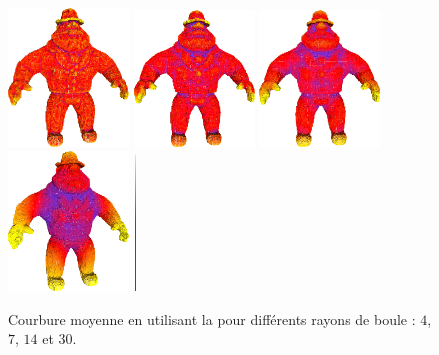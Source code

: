 \begin{figure}[ht]{
    \begin{center}
      \includegraphics[width=3.2cm]{images/Curvature/MeanAl_4}
      \includegraphics[width=3.2cm]{images/Curvature/MeanAl_7}
      \includegraphics[width=3.2cm]{images/Curvature/MeanAl_14}
      \includegraphics[width=3.2cm]{images/Curvature/MeanAl_30}
      \includegraphics[width=0.1cm,height=3.6cm]{images/YMTB6W}
    \end{center}}
    \caption{Courbure moyenne en utilisant la 
      pour différents rayons de boule : $4$, $7$, $14$ et $30$.
      \label{fig:curvature-scale-3d}}
\end{figure}

